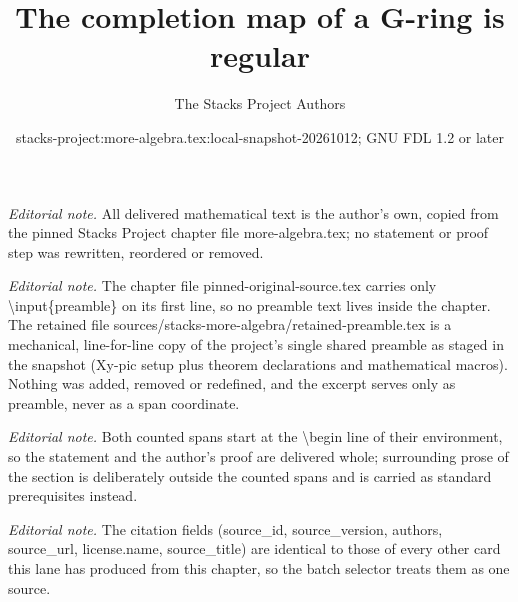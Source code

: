 \documentclass[10pt,a4paper]{amsart}
\title{The completion map of a G-ring is regular}
\author{The Stacks Project Authors}
\date{stacks-project:more-algebra.tex:local-snapshot-20261012; GNU FDL 1.2 or later}
\theoremstyle{plain}
\theoremstyle{definition}
\theoremstyle{remark}
\numberwithin{equation}{subsection}
\begin{document}
\maketitle
\setcounter{subsection}{1}
\noindent\textit{Editorial note.} All delivered mathematical text is the author's own, copied from the pinned Stacks Project chapter file more-algebra.tex; no statement or proof step was rewritten, reordered or removed.\par\medskip
\noindent\textit{Editorial note.} The chapter file pinned-original-source.tex carries only \textbackslash{}input\{preamble\} on its first line, so no preamble text lives inside the chapter. The retained file sources/stacks-more-algebra/retained-preamble.tex is a mechanical, line-for-line copy of the project's single shared preamble as staged in the snapshot (Xy-pic setup plus theorem declarations and mathematical macros). Nothing was added, removed or redefined, and the excerpt serves only as preamble, never as a span coordinate.\par\medskip
\noindent\textit{Editorial note.} Both counted spans start at the \textbackslash{}begin line of their environment, so the statement and the author's proof are delivered whole; surrounding prose of the section is deliberately outside the counted spans and is carried as standard prerequisites instead.\par\medskip
\noindent\textit{Editorial note.} The citation fields (source\_id, source\_version, authors, source\_url, license.name, source\_title) are identical to those of every other card this lane has produced from this chapter, so the batch selector treats them as one source.\par\medskip
\end{document}
